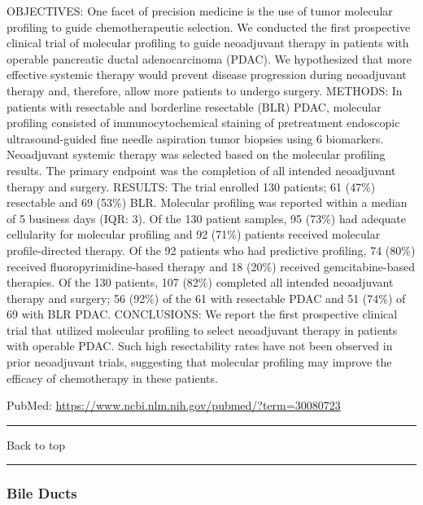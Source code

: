 \documentclass[]{article}
\begin{document}
OBJECTIVES: One facet of precision medicine is the use of tumor
molecular profiling to guide chemotherapeutic selection. We conducted
the first prospective clinical trial of molecular profiling to guide
neoadjuvant therapy in patients with operable pancreatic ductal
adenocarcinoma (PDAC). We hypothesized that more effective systemic
therapy would prevent disease progression during neoadjuvant therapy
and, therefore, allow more patients to undergo surgery. METHODS: In
patients with resectable and borderline resectable (BLR) PDAC, molecular
profiling consisted of immunocytochemical staining of pretreatment
endoscopic ultrasound-guided fine needle aspiration tumor biopsies using
6 biomarkers. Neoadjuvant systemic therapy was selected based on the
molecular profiling results. The primary endpoint was the completion of
all intended neoadjuvant therapy and surgery. RESULTS: The trial
enrolled 130 patients; 61 (47\%) resectable and 69 (53\%) BLR. Molecular
profiling was reported within a median of 5 business days (IQR: 3). Of
the 130 patient samples, 95 (73\%) had adequate cellularity for
molecular profiling and 92 (71\%) patients received molecular
profile-directed therapy. Of the 92 patients who had predictive
profiling, 74 (80\%) received fluoropyrimidine-based therapy and 18
(20\%) received gemcitabine-based therapies. Of the 130 patients, 107
(82\%) completed all intended neoadjuvant therapy and surgery; 56 (92\%)
of the 61 with resectable PDAC and 51 (74\%) of 69 with BLR PDAC.
CONCLUSIONS: We report the first prospective clinical trial that
utilized molecular profiling to select neoadjuvant therapy in patients
with operable PDAC. Such high resectability rates have not been observed
in prior neoadjuvant trials, suggesting that molecular profiling may
improve the efficacy of chemotherapy in these patients.

PubMed: \url{https://www.ncbi.nlm.nih.gov/pubmed/?term=30080723}

{}

{}

\begin{center}\rule{0.5\linewidth}{\linethickness}\end{center}

Back to top

\begin{center}\rule{0.5\linewidth}{\linethickness}\end{center}

\pagebreak

\hypertarget{bile-ducts-1}{%
\subsubsection{Bile Ducts}\label{bile-ducts-1}}
\end{document}
